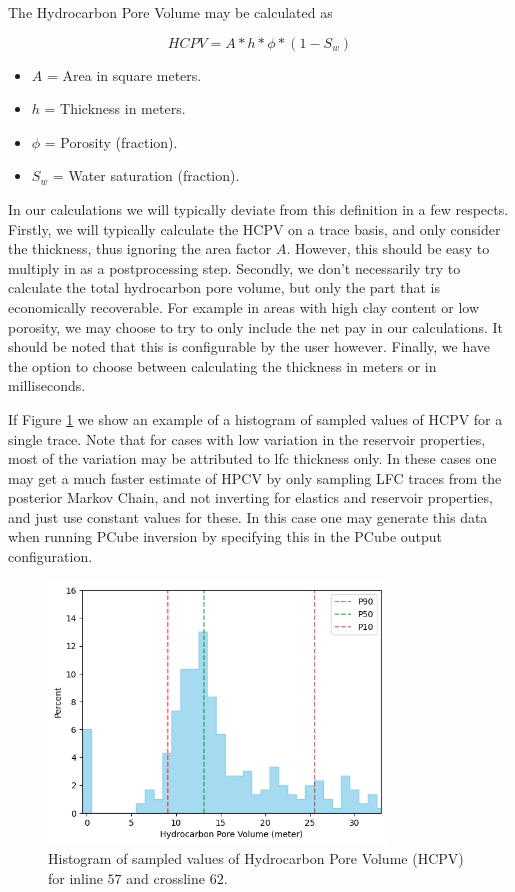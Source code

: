 \documentclass[note,screen,english,12pt,utf8]{nrdoc}
\begin{document}
The Hydrocarbon Pore Volume may be calculated as

\begin{equation}
HCPV = A * h * \phi * (1 - S_w)
\end{equation}

\begin{itemize}
    \item $A$ = Area in square meters.
    \item $h$ = Thickness in meters.
    \item $\phi$ = Porosity (fraction).
    \item $S_w$ = Water saturation (fraction).
\end{itemize}

In our calculations we will typically deviate from this definition in a few respects.
Firstly, we will typically calculate the HCPV on a trace basis, and only consider
the thickness, thus ignoring the area factor $A$. However, this should be easy to
multiply in as a postprocessing step.
Secondly, we don't necessarily try to calculate the total hydrocarbon
pore volume, but only the part that is economically recoverable. For example in areas
with high clay content or low porosity, we may choose to try to only include the net pay
in our calculations. It should be noted that this is configurable by the user however.
Finally, we have the option to choose between calculating the thickness in meters or in milliseconds.

If Figure \ref{fig:hydrocarbon_pore_volume} we show an example of a histogram of sampled values of
HCPV for a single trace. Note that for cases with low variation in the reservoir properties,
most of the variation may be attributed to lfc thickness only. In these cases one may get
a much faster estimate of HPCV by only sampling LFC traces from the posterior Markov Chain,
and not inverting for elastics and reservoir properties, and just use constant values for these.
In this case one may generate this data when running PCube inversion by specifying this
in the PCube output configuration.

\begin{figure}[h]
    \centering
    \includegraphics[width=0.8\textwidth]{figures/hydrocarbon_pore_volume_meters_il57_xl62.png}
    \caption{Histogram of sampled values of Hydrocarbon Pore Volume (HCPV) for inline $57$ and crossline $62$.}
    \label{fig:hydrocarbon_pore_volume}
\end{figure}
\end{document}

